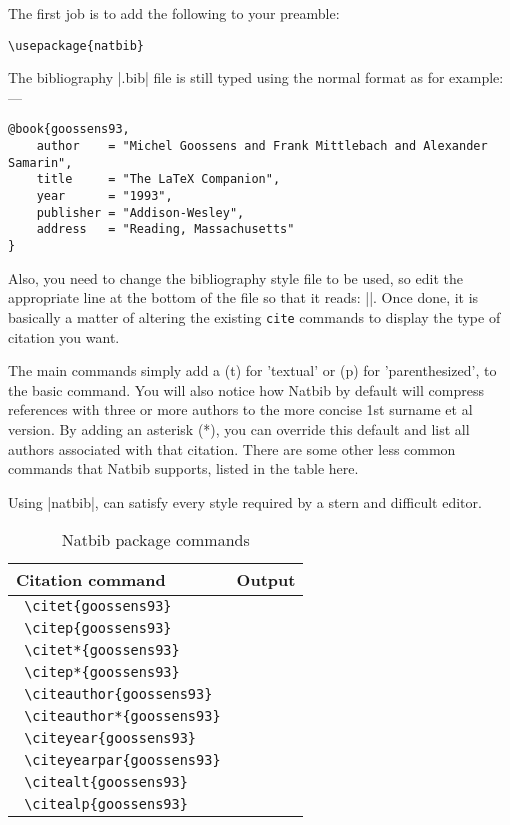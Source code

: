 The first job is to add the following to your preamble:

\begin{verbatim}
\usepackage{natbib}
\end{verbatim}


The bibliography |.bib| file is still typed using the normal format as for example:---

\begin{verbatim}
@book{goossens93,
    author    = "Michel Goossens and Frank Mittlebach and Alexander Samarin",
    title     = "The LaTeX Companion",
    year      = "1993",
    publisher = "Addison-Wesley",
    address   = "Reading, Massachusetts"
}
\end{verbatim}



Also, you need to change the bibliography style file to be used, so edit the appropriate line at the bottom of the file so that it reads: ||. Once done, it is basically a matter of altering the existing \texttt{cite} commands to display the type of citation you want.


The main commands simply add a (t)  for 'textual' or (p) for 'parenthesized', to the basic  command. You will also notice how Natbib by default will compress references with three or more authors to the more concise 1st surname et al version. By adding an asterisk (*), you can override this default and list all authors associated with that citation. There are some other less common commands that Natbib supports, listed in the table here.

Using |natbib|, can satisfy every style required by a stern and difficult editor.

\begin{table}
\begin{tabular}{ll}
\toprule
Citation command	&Output\\
\midrule
\verb+ \citet{goossens93}+	&\citet{goossens93}\\
\verb+ \citep{goossens93}+	&\citep{goossens93}\\
\verb+ \citet*{goossens93}+	&\citet*{goossens93}\\
\verb+ \citep*{goossens93}+	&\citep*{goossens93}\\
\verb+ \citeauthor{goossens93}+	&\citeauthor{goossens93} \\
\verb+ \citeauthor*{goossens93}+	&\citeauthor*{goossens93}\\
\verb+ \citeyear{goossens93}+	&\citeyear{goossens93}\\
\verb+ \citeyearpar{goossens93}+	&\citeyearpar{goossens93}\\
\verb+ \citealt{goossens93}+	&\citealt{goossens93}\\
\verb+ \citealp{goossens93}+	&\citealp{goossens93}\\
\bottomrule
\end{tabular}
\caption{Natbib package commands}
\end{table}

